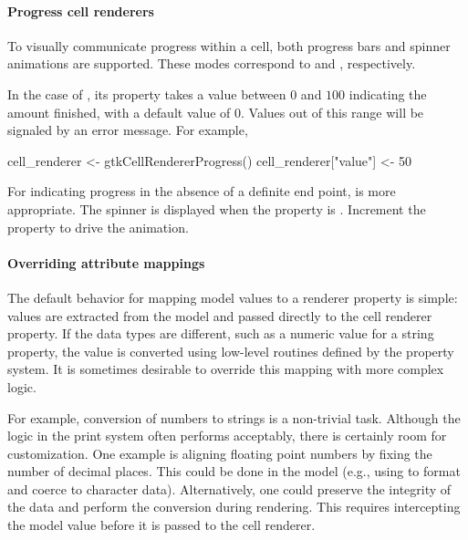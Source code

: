 \paragraph{Progress cell renderers}

To visually communicate progress within a cell, both progress bars and
spinner animations are supported. These modes correspond to
 and ,
respectively.

In the case of , its 
property takes a value between $0$ and $100$ indicating the amount
finished, with a default value of $0$. Values out of this range will
be signaled by an error message.  For example,
\begin{Schunk}
\begin{Sinput}
 cell_renderer <- gtkCellRendererProgress()
 cell_renderer["value"] <- 50
\end{Sinput}
\end{Schunk}

For indicating progress in the absence of a definite end point,
 is more appropriate. The spinner is
displayed when the  property is . Increment
the  property to drive the animation.

\paragraph{Overriding attribute mappings}

The default behavior for mapping model values to a renderer property
is simple: values are extracted from the model and passed directly to
the cell renderer property. If the data types are different, such as a
numeric value for a string property, the value is converted using
low-level routines defined by the property system. It is sometimes
desirable to override this mapping with more complex logic.

For example, conversion of numbers to strings is a non-trivial
task. Although the logic in the \R\/ print system often performs
acceptably, there is certainly room for customization. One example is
aligning floating point numbers by fixing the number of decimal
places. This could be done in the model (e.g., using
 to format and coerce to character
data). Alternatively, one could preserve the integrity of the data and
perform the conversion during rendering. This requires intercepting
the model value before it is passed to the cell renderer. 

